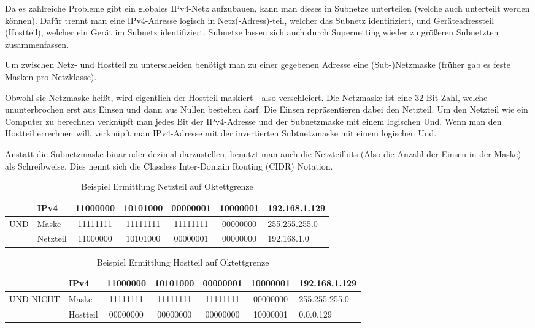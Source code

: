 Da es zahlreiche Probleme gibt ein globales IPv4-Netz aufzubauen, kann man dieses in Subnetze unterteilen (welche auch unterteilt werden können). Dafür trennt man eine IPv4-Adresse logisch in Netz(-Adress)-teil, welcher das Subnetz identifiziert, und Geräteadressteil (Hostteil), welcher ein Gerät im Subnetz identifiziert. Subnetze lassen sich auch durch Supernetting wieder zu größeren Subnetzten zusammenfassen.

Um zwischen Netz- und Hostteil zu unterscheiden benötigt man zu einer gegebenen Adresse eine (Sub-)Netzmaske (früher gab es feste Masken pro Netzklasse).

Obwohl sie Netzmaske heißt, wird eigentlich der Hostteil maskiert - also verschleiert. Die Netzmaske ist eine 32-Bit Zahl, welche ununterbrochen erst aus Einsen und dann aus Nullen bestehen darf. Die Einsen repräsentieren dabei den Netzteil. Um den Netzteil wie ein Computer zu berechnen verknüpft man jedes Bit der IPv4-Adresse und der Subnetzmaske mit einem logischen Und. Wenn man den Hostteil errechnen will, verknüpft man IPv4-Adresse mit der invertierten Subtnetzmaske mit einem logischen Und.

Anstatt die Subnetzmaske binär oder dezimal darzustellen, benutzt man auch die Netzteilbits (Also die Anzahl der Einsen in der Maske) als Schreibweise. Dies nennt sich die Classless Inter-Domain Routing (CIDR) Notation.

\begin{table}
    [H]
    \centering
    \begin{tabular}{|c|l|cccc|l|}
        \hline
            & IPv4     & 11000000 & 10101000 & 00000001 & 10000001 & 192.168.1.129 \\\hline
        UND & Maske    & 11111111 & 11111111 & 11111111 & 00000000 & 255.255.255.0 \\\hline
        =   & Netzteil & 11000000 & 10101000 & 00000001 & 00000000 & 192.168.1.0   \\\hline
    \end{tabular}
    \caption{Beispiel Ermittlung Netzteil auf Oktettgrenze}
    \label{tab:lf9:bsp:ErmittlungNetzteil}
\end{table}

\begin{table}
    [H]
    \centering
    \begin{tabular}{|c|l|cccc|l|}
        \hline
                  & IPv4     & 11000000 & 10101000 & 00000001 & 10000001 & 192.168.1.129 \\\hline
        UND NICHT & Maske    & 11111111 & 11111111 & 11111111 & 00000000 & 255.255.255.0 \\\hline
        =         & Hostteil & 00000000 & 00000000 & 00000000 & 10000001 & 0.0.0.129     \\\hline
    \end{tabular}
    \caption{Beispiel Ermittlung Hostteil auf Oktettgrenze}
\end{table}

